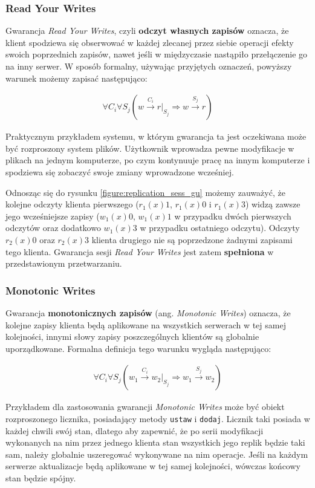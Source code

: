 \subsubsection{Read Your Writes}

Gwarancja \textit{Read Your Writes}, czyli \textbf{odczyt własnych zapisów} oznacza, że klient spodziewa się obserwować w każdej zlecanej przez siebie operacji efekty swoich poprzednich zapisów, nawet jeśli w międzyczasie nastąpiło przełączenie go na inny serwer. W sposób formalny, używając przyjętych oznaczeń, powyższy warunek możemy zapisać następująco:

\begin{align*}
    \forall{C_i} \forall{S_j} (w \xrightarrow{C_i} r|_{S_j} \Rightarrow w \xrightarrow{S_j} r)
\end{align*}

Praktycznym przykładem systemu, w którym gwarancja ta jest oczekiwana może być rozproszony system plików. Użytkownik wprowadza pewne modyfikacje w plikach na jednym komputerze, po czym kontynuuje pracę na innym komputerze i spodziewa się zobaczyć swoje zmiany wprowadzone wcześniej.

Odnosząc się do rysunku \ref{figure:replication_sess_gu} możemy zauważyć, że kolejne odczyty klienta pierwszego ($ r_1(x)1 $, $ r_1(x)0 $ i $ r_1(x)3 $) widzą zawsze jego wcześniejsze zapisy ($ w_1(x)0 $, $ w_1(x)1 $ w przypadku dwóch pierwszych odczytów oraz dodatkowo $ w_1(x)3 $ w przypadku ostatniego odczytu).
Odczyty $ r_2(x)0 $ oraz $ r_2(x)3 $ klienta drugiego nie są poprzedzone żadnymi zapisami tego klienta. Gwarancja sesji \textit{Read Your Writes} jest zatem \textbf{spełniona} w przedstawionym przetwarzaniu.

\subsubsection{Monotonic Writes}

Gwarancja \textbf{monotonicznych zapisów} (ang. \textit{Monotonic Writes}) oznacza, że kolejne zapisy klienta będą aplikowane na wszystkich serwerach w tej samej kolejności, innymi słowy zapisy poszczególnych klientów są globalnie uporządkowane. Formalna definicja tego warunku wygląda następująco:

\begin{align*}
    \forall{C_i} \forall{S_j} (w_1 \xrightarrow{C_i} w_2|_{S_j} \Rightarrow w_1 \xrightarrow{S_j} w_2)
\end{align*}

Przykładem dla zastosowania gwarancji \textit{Monotonic Writes} może być obiekt rozproszonego licznika, posiadający metody \texttt{ustaw} i \texttt{dodaj}. Licznik taki posiada w każdej chwili swój stan, dlatego aby zapewnić, że po serii modyfikacji wykonanych na nim przez jednego klienta stan wszystkich jego replik będzie taki sam, należy globalnie uszeregować wykonywane na nim operacje. Jeśli na każdym serwerze aktualizacje będą aplikowane w tej samej kolejności, wówczas końcowy stan będzie spójny.

